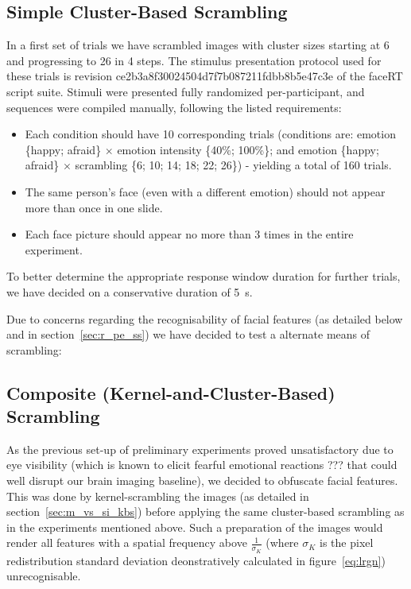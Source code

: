 	\subsection{Simple Cluster-Based Scrambling}\label{sec:m_pe_ss}
	    In a first set of trials we have scrambled images with cluster sizes starting at \SI{6}{\pixel} and progressing to \SI{26}{\pixel} in \SI{4}{\pixel} steps.
	    The stimulus presentation protocol used for these trials is revision \textcolor{lg}{ce2b3a8f30024504d7f7b087211fdbb8b5e47c3e} of the faceRT\cite{faceRT} script suite.
	    Stimuli were presented fully randomized per-participant, and sequences were compiled manually, following the listed requirements:
	    \begin{itemize}
		\item Each condition should have 10 corresponding trials (conditions are: emotion \{happy; afraid\} $\times$ emotion intensity \{40\%; 100\%\}; and emotion \{happy; afraid\} $\times$ scrambling \{6; 10; 14; 18; 22; 26\}) - yielding a total of 160 trials.
		\item The same person's face (even with a different emotion) should not appear more than once in one slide.
		\item Each face picture should appear no more than 3 times in the entire experiment.
	    \end{itemize}
	    To better determine the appropriate response window duration for further trials, we have decided on a conservative duration of \SI{5}{\second}.
	    
	    Due to concerns regarding the recognisability of facial features (as detailed below and in section~\ref{sec:r_pe_ss}) we have decided to test a alternate means of scrambling:
	\subsection{Composite (Kernel-and-Cluster-Based) Scrambling}\label{sec:m_pe_cs}
	    As the previous set-up of preliminary experiments proved unsatisfactory due to eye visibility (which is known to elicit fearful emotional reactions ??? that could well disrupt our brain imaging baseline), we decided to obfuscate facial features.
	    This was done by kernel-scrambling the images (as detailed in section~\ref{sec:m_vs_si_kbs}) before applying the same cluster-based scrambling as in the experiments mentioned above.
	    Such a preparation of the images would render all features with a spatial frequency above $\frac{1}{\sigma_{K}}$ (where $\sigma_{K}$ is the pixel redistribution standard deviation deonstratively calculated in figure~\ref{eq:lrgn}) unrecognisable.
	    

